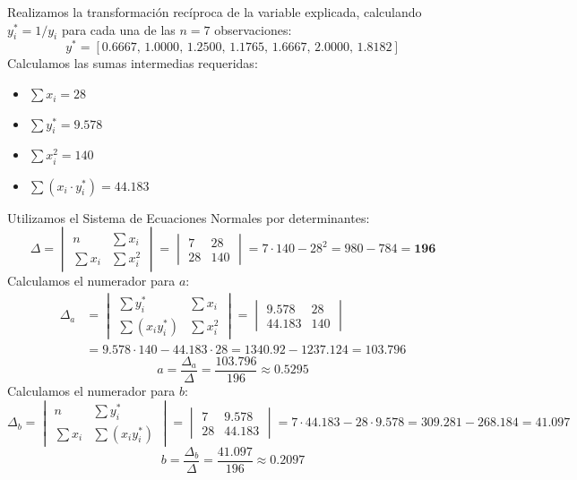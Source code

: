 \documentclass[11pt,a4paper]{article}
\begin{document}
    Realizamos la transformación recíproca de la variable explicada, calculando $y^*_i = 1/y_i$ para cada una de las $n = 7$ observaciones:
    \[ y^* = [0.6667, \, 1.0000, \, 1.2500, \, 1.1765, \, 1.6667, \, 2.0000, \, 1.8182] \]
    Calculamos las sumas intermedias requeridas:
    \begin{itemize}
        \item $\sum x_i = 28$
        \item $\sum y^*_i = 9.578$
        \item $\sum x_i^2 = 140$
        \item $\sum (x_i \cdot y^*_i) = 44.183$
    \end{itemize}
    Utilizamos el Sistema de Ecuaciones Normales por determinantes:
    \[ \Delta = \begin{vmatrix} n & \sum x_i \\ \sum x_i & \sum x_i^2 \end{vmatrix} = \begin{vmatrix} 7 & 28 \\ 28 & 140 \end{vmatrix} = 7 \cdot 140 - 28^2 = 980 - 784 = \mathbf{196} \]
    Calculamos el numerador para $a$:
    \begin{align*}
    \Delta_a
      &= \begin{vmatrix} \sum y^*_i & \sum x_i \\ \sum (x_i y^*_i) & \sum x_i^2 \end{vmatrix}
       = \begin{vmatrix} 9.578 & 28 \\ 44.183 & 140 \end{vmatrix} \\
      &= 9.578 \cdot 140 - 44.183 \cdot 28
       = 1340.92 - 1237.124 = \mathbf{103.796}
    \end{align*}
    \[ a = \frac{\Delta_a}{\Delta} = \frac{103.796}{196} \approx \mathbf{0.5295} \]
    Calculamos el numerador para $b$:
    \[ \Delta_b = \begin{vmatrix} n & \sum y^*_i \\ \sum x_i & \sum (x_i y^*_i) \end{vmatrix} = \begin{vmatrix} 7 & 9.578 \\ 28 & 44.183 \end{vmatrix} = 7 \cdot 44.183 - 28 \cdot 9.578 = 309.281 - 268.184 = \mathbf{41.097} \]
    \[ b = \frac{\Delta_b}{\Delta} = \frac{41.097}{196} \approx \mathbf{0.2097} \]
\end{document}
